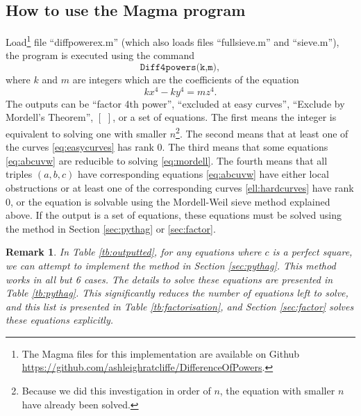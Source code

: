 \documentclass[a4paper,12pt,english,reqno]{amsart}
\newtheorem{remark}{Remark}
\begin{document}
\subsection{How to use the Magma program} \label{magma}
Load\footnote{The Magma files for this implementation are available on Github \url{https://github.com/ashleighratcliffe/DifferenceOfPowers}.} file ``diffpowerex.m'' (which also loads files ``fullsieve.m'' and ``sieve.m''), the program is executed using the command 
$$
\texttt{Diff4powers(k,m)}, 
$$
where $k$ and $m$ are integers which are the coefficients of the equation
 \begin{equation}
kx^4 - ky^4= mz^4.
\end{equation}
The outputs can be ``factor 4th power'', ``excluded at easy curves'', ``Exclude by Mordell's Theorem'', $[\,\, ]$, or a set of equations. The first means the integer is equivalent to solving one with smaller $n$\footnote{Because we did this investigation in order of $n$, the equation with smaller $n$ have already been solved.}. The second means that at least one of the curves \eqref{eq:easycurves} has rank $0$. The third means that some equations \eqref{eq:abcuvw} are reducible to solving \eqref{eq:mordell}. The fourth means that all triples $(a,b,c)$ have corresponding equations \eqref{eq:abcuvw} have either local obstructions or at least one of the corresponding curves \eqref{ell:hardcurves} have rank $0$, or the equation is solvable using the Mordell-Weil sieve method explained above. If the output is a set of equations, these equations must be solved using the method in Section \ref{sec:pythag} or \ref{sec:factor}. 




\begin{remark}
In Table \ref{tb:outputted}, for any equations where $c$ is a perfect square, we can attempt to implement the method in Section \ref{sec:pythag}. This method works in all but 6 cases. The details to solve these equations are presented in Table \ref{tb:pythag}.  This significantly reduces the number of equations left to solve, and this list is presented in Table \ref{tb:factorisation}, and Section \ref{sec:factor} solves these equations explicitly. 
\end{remark}
\end{document}
